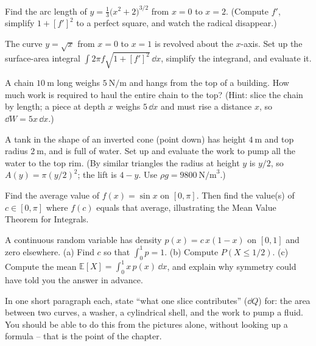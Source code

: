 \begin{exercise}
Find the arc length of $y = \tfrac{1}{3}\bigl(x^2+2\bigr)^{3/2}$ from $x=0$ to
$x=2$. (Compute $f'$, simplify $1+[f']^2$ to a perfect square, and watch the
radical disappear.)
\end{exercise}

\begin{exercise}
The curve $y=\sqrt{x}$ from $x=0$ to $x=1$ is revolved about the $x$-axis. Set up
the surface-area integral $\int 2\pi f\sqrt{1+[f']^2}\,\dd x$, simplify the
integrand, and evaluate it.
\end{exercise}

\begin{exercise}
A chain $10\ \text{m}$ long weighs $5\ \text{N/m}$ and hangs from the top of a
building. How much work is required to haul the entire chain to the top? (Hint:
slice the chain by length; a piece at depth $x$ weighs $5\,\dd x$ and must rise a
distance $x$, so $\dd W = 5x\,\dd x$.)
\end{exercise}

\begin{exercise}
A tank in the shape of an inverted cone (point down) has height $4\ \text{m}$ and
top radius $2\ \text{m}$, and is full of water. Set up and evaluate the work to pump
all the water to the top rim. (By similar triangles the radius at height $y$ is
$y/2$, so $A(y) = \pi(y/2)^2$; the lift is $4-y$. Use $\rho g = 9800\
\text{N/m}^3$.)
\end{exercise}

\begin{exercise}
Find the average value of $f(x) = \sin x$ on $[0,\pi]$. Then find the value(s) of
$c\in[0,\pi]$ where $f(c)$ equals that average, illustrating the Mean Value Theorem
for Integrals.
\end{exercise}

\begin{exercise}
A continuous random variable has density $p(x) = c\,x(1-x)$ on $[0,1]$ and zero
elsewhere. (a) Find $c$ so that $\int_0^1 p = 1$. (b) Compute $P(X \le 1/2)$.
(c) Compute the mean $\mathbb{E}[X] = \int_0^1 x\,p(x)\,\dd x$, and explain why
symmetry could have told you the answer in advance.
\end{exercise}

\begin{exercise}
In one short paragraph each, state ``what one slice contributes'' ($\dd Q$) for:
the area between two curves, a washer, a cylindrical shell, and the work to pump a
fluid. You should be able to do this from the pictures alone, without looking up a
formula -- that is the point of the chapter.
\end{exercise}

